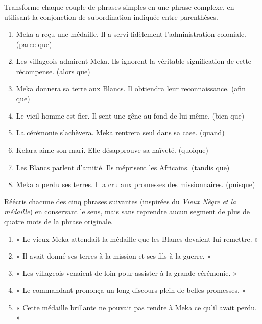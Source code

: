 \documentclass[11pt]{article}
\begin{document}
\begin{exercice}
Transforme chaque couple de phrases simples en une phrase complexe, en utilisant la conjonction de subordination indiquée entre parenthèses.
\begin{enumerate}
\item Meka a reçu une médaille. Il a servi fidèlement l'administration coloniale. (parce que)
\item Les villageois admirent Meka. Ils ignorent la véritable signification de cette récompense. (alors que)
\item Meka donnera sa terre aux Blancs. Il obtiendra leur reconnaissance. (afin que)
\item Le vieil homme est fier. Il sent une gêne au fond de lui-même. (bien que)
\item La cérémonie s'achèvera. Meka rentrera seul dans sa case. (quand)
\item Kelara aime son mari. Elle désapprouve sa naïveté. (quoique)
\item Les Blancs parlent d'amitié. Ils méprisent les Africains. (tandis que)
\item Meka a perdu ses terres. Il a cru aux promesses des missionnaires. (puisque)
\end{enumerate}
\end{exercice}

\begin{exercice}
Réécris chacune des cinq phrases suivantes (inspirées du \emph{Vieux Nègre et la médaille}) en conservant le sens, mais sans reprendre aucun segment de plus de quatre mots de la phrase originale.
\begin{enumerate}
\item « Le vieux Meka attendait la médaille que les Blancs devaient lui remettre. »
\item « Il avait donné ses terres à la mission et ses fils à la guerre. »
\item « Les villageois venaient de loin pour assister à la grande cérémonie. »
\item « Le commandant prononça un long discours plein de belles promesses. »
\item « Cette médaille brillante ne pouvait pas rendre à Meka ce qu'il avait perdu. »
\end{enumerate}
\end{exercice}
\end{document}
